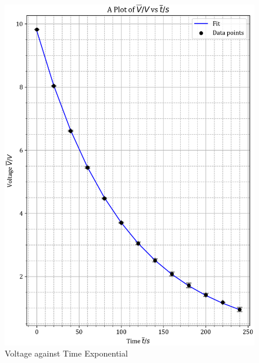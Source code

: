 \documentclass[12pt, a4paper]{article}
\begin{document}
\begin{figure}
    \centering
    \includegraphics[width=\textwidth]{Experiment0ExpPlot.png}
    \caption{Voltage against Time Exponential}
    \label{fig:Exponential Graph}
\end{figure}
    
\end{document}
